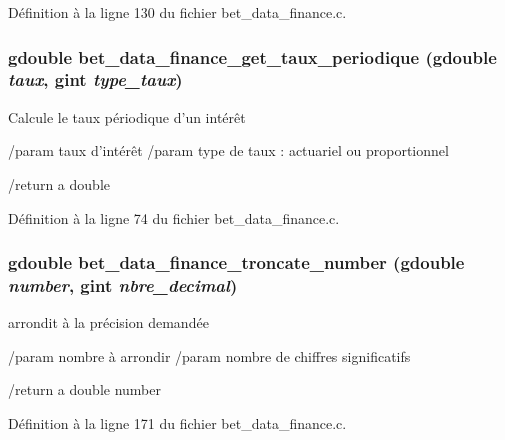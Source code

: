 Définition à la ligne 130 du fichier bet\_\-data\_\-finance.c.

\subsubsection[{bet\_\-data\_\-finance\_\-get\_\-taux\_\-periodique}]{\setlength{\rightskip}{0pt plus 5cm}gdouble bet\_\-data\_\-finance\_\-get\_\-taux\_\-periodique (gdouble {\em taux}, \/  gint {\em type\_\-taux})}\label{bet__data__finance_8c_ad31dc1b97b1e3874d40e5dae112aa66c}
Calcule le taux périodique d'un intérêt

/param taux d'intérêt /param type de taux : actuariel ou proportionnel

/return a double 

Définition à la ligne 74 du fichier bet\_\-data\_\-finance.c.

\subsubsection[{bet\_\-data\_\-finance\_\-troncate\_\-number}]{\setlength{\rightskip}{0pt plus 5cm}gdouble bet\_\-data\_\-finance\_\-troncate\_\-number (gdouble {\em number}, \/  gint {\em nbre\_\-decimal})}\label{bet__data__finance_8c_a6e87f9712fa8d75a50417f77f17cf53e}
arrondit à la précision demandée

/param nombre à arrondir /param nombre de chiffres significatifs

/return a double number 

Définition à la ligne 171 du fichier bet\_\-data\_\-finance.c.

